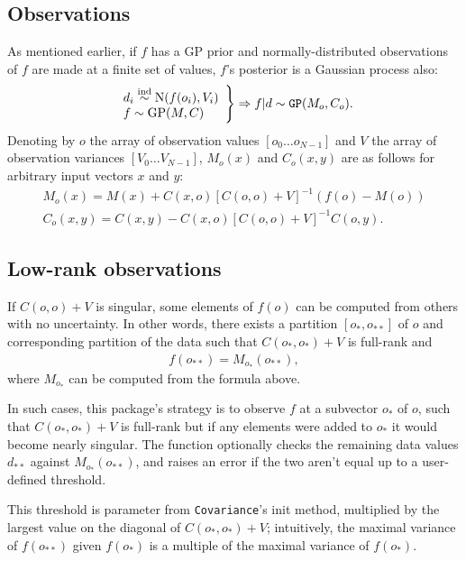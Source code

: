 \documentclass[]{manual}
\begin{document}
\subsection{Observations}
As mentioned earlier, if $f$ has a GP prior and normally-distributed observations of $f$ are made at a finite set of values, $f$'s posterior is a Gaussian process also:
\begin{eqnarray*}
    \left.\begin{array}{l}
        d_i \stackrel{\tiny{\textup{ind}}}{\sim} \textup{N}(f(o_i), V_i)\\
        f \sim \textup{GP}(M,C)
    \end{array}\right\}\Rightarrow f|d \sim \texttt{GP}(M_o, C_o).
\end{eqnarray*}
Denoting by $o$ the array of observation values $[o_0\ldots o_{N-1}]$ and $V$ the array of observation variances $[V_0\ldots V_{N-1}]$, $M_o(x)$ and $C_o(x,y)$ are as follows for arbitrary input vectors $x$ and $y$:
\begin{eqnarray*}
    M_o(x) = M(x) + C(x,o)[C(o,o) + V]^{-1}(f(o)-M(o))\\
    C_o(x,y) = C(x,y) - C(x,o)[C(o,o) + V]^{-1}C(o,y).
\end{eqnarray*}

\subsection{Low-rank observations}

If $C(o,o)+V$ is singular, some elements of $f(o)$ can be computed from others with no uncertainty. In other words, there exists a partition $[o_*, o_{**}]$ of $o$ and corresponding partition of the data such that $C(o_*,o_*)+V$ is full-rank and
\begin{eqnarray*}
    f(o_{**}) = M_{o_*}(o_{**}),
\end{eqnarray*}
where $M_{o_*}$ can be computed from the formula above.

In such cases, this package's strategy is to observe $f$ at a subvector $o_*$ of $o$, such that $C(o_*,o_*)+V$ is full-rank but if any elements were added to $o_*$ it would become nearly singular. The function  optionally checks the remaining data values $d_{**}$ against $M_{o_*}(o_{**})$, and raises an error if the two aren't equal up to a user-defined threshold.

This threshold is parameter  from \texttt{Covariance}'s init method, multiplied by the largest value on the diagonal of $C(o_*,o_*)+V$; intuitively, the maximal variance of $f(o_{**})$ given $f(o_*)$ is a multiple of the maximal variance of $f(o_*)$.
\end{document}
